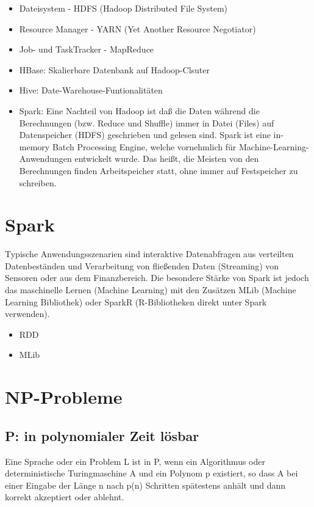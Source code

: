 \documentclass{article}
\begin{document}
\begin{multicols}{2}
\begin{itemize}
    \item Dateisystem - HDFS (Hadoop Distributed File System)
    \item Resource Manager - YARN (Yet Another Resource Negotiator)
    \item Job- und TaskTracker - MapReduce
    \item HBase: Skalierbare Datenbank auf Hadoop-Clsuter
    \item Hive: Date-Warehouse-Funtionalitäten
    \item Spark: Eine Nachteil von Hadoop ist daß die Daten während die
Berechnungen (bzw. Reduce und Shuffle) immer in Datei (Files) auf
Datenspeicher (HDFS) geschrieben und gelesen sind.
Spark ist eine in-memory Batch Processing Engine, welche
vornehmlich für Machine-Learning-Anwendungen entwickelt wurde.
Das heißt, die Meisten von den Berechnungen finden
Arbeitspeicher statt, ohne immer auf Festspeicher zu schreiben.
\end{itemize}

\section{Spark}

Typische Anwendungsszenarien sind interaktive Datenabfragen aus verteilten Datenbeständen und Verarbeitung von fließenden Daten (Streaming) von Sensoren oder aus dem Finanzbereich. Die besondere Stärke von Spark ist jedoch das maschinelle Lernen
(Machine Learning) mit den Zusätzen MLib (Machine Learning Bibliothek) oder SparkR (R-Bibliotheken direkt unter Spark verwenden).

\begin{itemize}
    \item RDD
    \item MLib
\end{itemize}

\section{NP-Probleme}

\subsection{P: in polynomialer Zeit lösbar}

Eine Sprache oder ein Problem L ist in P, wenn ein Algorithmus oder deterministische Turingmaschine A und ein Polynom p existiert, so dass A bei einer Eingabe der Länge n nach p(n) Schritten spätestens anhält und dann korrekt akzeptiert oder ablehnt.


\end{multicols}
\end{document}
